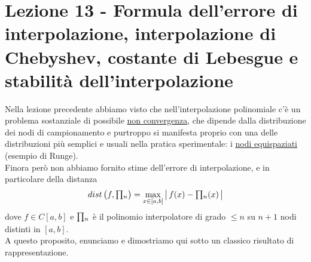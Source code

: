 \section[Lezione 13 - Stabilità dell'interpolazione]{Lezione 13 - Formula dell'errore di interpolazione, interpolazione di Chebyshev, costante di Lebesgue e stabilità dell'interpolazione}

Nella lezione precedente abbiamo visto che nell'interpolazione polinomiale c'è un problema sostanziale di possibile \uline{non convergenza}, che dipende dalla distribuzione dei nodi di campionamento e purtroppo si manifesta proprio con una delle distribuzioni più semplici e usuali nella pratica sperimentale: i \uline{nodi equispaziati} (esempio di Runge).\\
Finora però non abbiamo fornito stime dell'errore di interpolazione, e in particolare della distanza
\[dist \left(f,\inter_n \right) = \max_{x \in [a,b]}\, \abs*{\,f(x) - \inter_n(x)\,}\]
dove $f \in C[a,b]$ e $\begin{matrix}\prod\end{matrix}_n$ è il polinomio interpolatore di grado $\le n$ su $n+1$ nodi distinti in $[a,b]$.\\
A questo proposito, enunciamo e dimostriamo qui sotto un classico risultato di rappresentazione.

